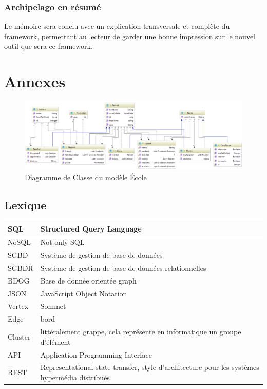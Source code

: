 \documentclass[a4paper,fleqn,12pt]{report}
\begin{document}
\section{Archipelago en résumé}
Le mémoire sera conclu avec un explication transversale et complète du framework, permettant au lecteur de garder une bonne impression sur le nouvel outil que sera ce framework.
\part{Annexes}
\begin{figure}
    \includegraphics[scale=0.8]{figures/SchoolDiag.png}
    \caption{Diagramme de Classe du modèle École}
    \label{fig:SchoolDiagram}
\end{figure}
\chapter*{Lexique}
\begin{center}
\begin{tabular}[c]{ l p{14cm} }
 SQL  & Structured Query Language \\ \hline
 NoSQL  & Not only SQL \\ \hline
 SGBD  & Système de gestion de base de données \\ \hline
 SGBDR  & Système de gestion de base de données relationnelles \\ \hline
 BDOG  & Base de donnée orientée graph \\ \hline
 JSON  & JavaScript Object Notation \\ \hline
 Vertex  & Sommet \\ \hline
 Edge  & bord \\ \hline
 Cluster  & littéralement grappe, cela représente en informatique un groupe d'élément \\ \hline
 API  & Application Programming Interface  \\ \hline
 REST  & Representational state transfer, style d'architecture pour les systèmes hypermédia distribués \\ \hline
\end{tabular}
\end{center}
\end{document}
